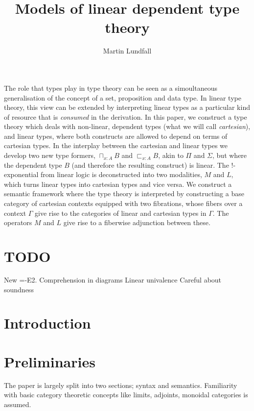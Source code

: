 
\usepackage[margin=0.5in]{geometry}
\usepackage{todonotes}
\newtheorem{lemm}[thm]{Lemma}
\newtheorem{remrk}[thm]{Remark}
\newtheorem{corl}[thm]{Corollary}
\newtheorem{expl}[thm]{Example}

\title{Models of linear dependent type theory}
\author{Martin Lundfall}
\maketitle
\abstract
The role that types play in type theory can be seen as a simoultaneous generalisation of the concept of a set, proposition and data type. In linear type theory, this view can be extended by interpreting linear types as a particular kind of resource that is \textit{consumed} in the derivation. In this paper, we construct a type theory which deals with non-linear, dependent types (what we will call \textit{cartesian}), and linear types, where both constructs are allowed to depend on terms of cartesian types. In the interplay between the cartesian and linear types we develop two new type formers, $\sqcap_{x : A}B$ and $\sqsubset_{x : A}B$, akin to $\Pi$ and $\Sigma$, but where the dependent type $B$ (and therefore the resulting construct) is linear. The $!$-exponential from linear logic is deconstructed into two modalities, $M$ and $L$, which turns linear types into cartesian types and vice versa. We construct a semantic framework where the type theory is interpreted by constructing a base category of cartesian contexts equipped with two fibrations, whose fibers over a context $\Gamma$ give rise to the categories of linear and cartesian types in $\Gamma$. The operators $M$ and $L$ give rise to a fiberwise adjunction between these. 
\newpage
\tableofcontents
\newpage
\section{TODO}
New =-E2.
Comprehension in diagrams
Linear univalence
Careful about soundness
\section{Introduction}
\section{Preliminaries}
The paper is largely split into two sections; syntax and semantics. 
Familiarity with basic category theoretic concepts like limits, adjoints, monoidal categories is assumed.
